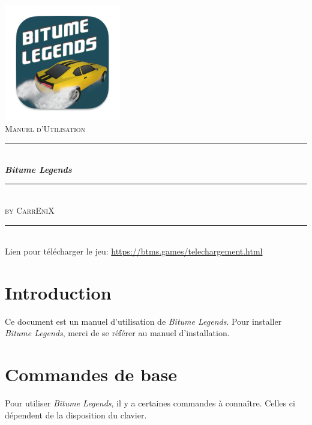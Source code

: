 \documentclass[a4paper,12pt]{article}
\newcommand{\HRule}{\rule{\linewidth}{0.5mm}}
\newcommand{\btmlgs}{\textsl{Bitume Legends}}
\newcommand{\CEX}{\textsc{CarrEniX}}
\newcommand{\report}{Manuel d'Utilisation}
\begin{document}
  

    \begin{titlepage}
        \begin{center}
            \includegraphics[scale=0.7]{logo192.png}\\[0.5cm]
            \textsc{\Large \report}\\[1.5cm]

            \HRule \\[0.4cm]
            { \LARGE \bfseries \btmlgs \\[0.4cm] }

            \HRule \\[2cm]
        
            \textsc{by \Large \CEX}\\[7cm]
            \HRule\\
            Lien pour télécharger le jeu: \url{https://btms.games/telechargement.html}
        \end{center}
    \end{titlepage}

    \tableofcontents
    \clearpage

    \section*{Introduction}
        Ce document est un manuel d'utilisation de \btmlgs.
        Pour installer \btmlgs, merci de se référer au manuel d'installation.

    \section{Commandes de base}
        Pour utiliser \btmlgs, il y a certaines commandes à connaître.
        Celles ci dépendent de la disposition du clavier.
\end{document}
